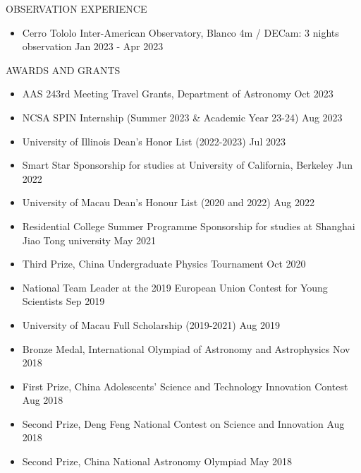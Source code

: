 \documentclass[10pt]{article} %
\begin{document}
\begin{section}{OBSERVATION EXPERIENCE}
    
\begin{itemize}[leftmargin=1.5em]
    \item Cerro Tololo Inter-American Observatory, Blanco 4m / DECam: 3 nights observation \hfill Jan 2023 - Apr 2023
\end{itemize}

\end{section}

\begin{section}{AWARDS AND GRANTS}

\begin{itemize}[leftmargin=1.5em]
    \item AAS 243rd Meeting Travel Grants, Department of Astronomy \hfill Oct 2023
    \item NCSA SPIN Internship (Summer 2023 \& Academic Year 23-24) \hfill Aug 2023 
    \item University of Illinois Dean's Honor List (2022-2023) \hfill Jul 2023
    \item Smart Star Sponsorship for studies at University of California, Berkeley \hfill Jun 2022
    \item University of Macau Dean's Honour List (2020 and 2022) \hfill Aug 2022
    \item Residential College Summer Programme Sponsorship for studies at Shanghai Jiao Tong university \hfill May 2021
    \item Third Prize, China Undergraduate Physics Tournament \hfill Oct 2020
    \item National Team Leader at the 2019 European Union Contest for Young Scientists \hfill Sep 2019
    \item University of Macau Full Scholarship (2019-2021) \hfill Aug 2019
    \item Bronze Medal, International Olympiad of Astronomy and Astrophysics \hfill Nov 2018
    \item First Prize, China Adolescents' Science and Technology Innovation Contest \hfill Aug 2018
    \item Second Prize, Deng Feng National Contest on Science and Innovation \hfill Aug 2018
    \item Second Prize, China National Astronomy Olympiad \hfill May 2018
\end{itemize}
    
\end{section}
\end{document}

